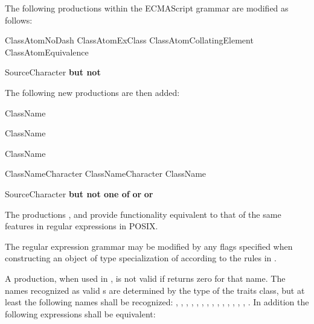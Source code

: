 \pnum
The following productions within the ECMAScript grammar are modified as follows:

\begin{ncrebnf}
\br
  \terminal{-}\br
  ClassAtomNoDash\br
  ClassAtomExClass\br
  ClassAtomCollatingElement\br
  ClassAtomEquivalence

\br
  SourceCharacter \textnormal{\textbf{but not}} 
\end{ncrebnf}

\pnum
The following new productions are then added:

\begin{ncrebnf}
\br
  \terminal{[:} ClassName \terminal{:]}

\br
  \terminal{[.} ClassName \terminal{.]}

\br
  \terminal{[=} ClassName \terminal{=]}

\br
  ClassNameCharacter\br
  ClassNameCharacter ClassName

\br
  SourceCharacter \textnormal{\textbf{but not one of}}  \textnormal{\textbf{or}} \terminal{=} \textnormal{\textbf{or}} \terminal{:}
\end{ncrebnf}

\pnum
The productions , 
and  provide functionality
equivalent to that of the same features in regular expressions in POSIX.

\pnum
The regular expression grammar may be modified by
any  flags specified when
constructing an object of type specialization of 
according to the rules in .

\pnum
A  production, when used in ,
is not valid if  returns zero for
that name.  The names recognized as valid s are
determined by the type of the traits class, but at least the following
names shall be recognized:
, , , , ,
, , , , ,
, , , , .
In addition the following expressions shall be equivalent:

